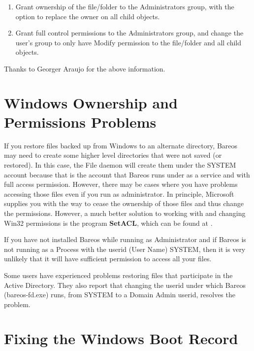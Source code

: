 \begin{enumerate}
\item Grant ownership of the file/folder to the Administrators group,
with the option to replace the owner on all child objects.
\item Grant full control permissions to the Administrators group,
and change the user's group to only have Modify permission to
the file/folder and all child objects.
\end{enumerate}

Thanks to Georger Araujo for the above information.

\section{Windows Ownership and Permissions Problems}

If you restore files backed up from Windows to an alternate directory,
Bareos may need to create some higher level directories that were not saved
(or restored). In this case, the File daemon will create them under the SYSTEM
account because that is the account that Bareos runs under as a service and with full access permission.
However, there may be cases where you have problems accessing those files even
if you run as administrator. In principle, Microsoft supplies you with the way
to cease the ownership of those files and thus change the permissions.
However, a much better solution to working with and changing Win32 permissions
is the program {\bf SetACL}, which can be found at
.

If you have not installed Bareos while running as Administrator
and if Bareos is not running as a Process with the userid (User Name) SYSTEM,
then it is very unlikely that it will have sufficient permission to
access all your files.

Some users have experienced problems restoring files that participate in
the Active Directory. They also report that changing the userid under which
Bareos (bareos-fd.exe) runs, from SYSTEM to a Domain Admin userid, resolves
the problem.



\section{Fixing the Windows Boot Record}

